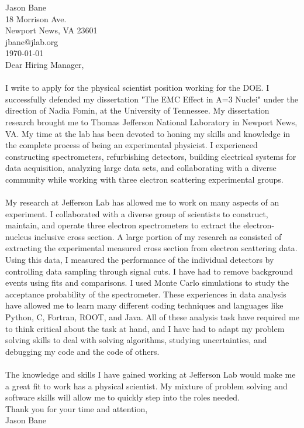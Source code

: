 \documentclass[12pt,letterpaper]{article}
\newcommand{\CPP}
{C\nolinebreak[4]\hspace{-.05em}\raisebox{.22ex}{\footnotesize\bf ++}}
\begin{document}
\vspace*{-1.2cm}
\noindent Jason Bane\\
18 Morrison Ave. \\
Newport News, VA 23601 \\
jbane@jlab.org \\
\today\\

Dear Hiring Manager,

\paragraph{}I write to apply for the physical scientist position working for the DOE. I successfully defended my dissertation "The EMC Effect in A=3 Nuclei" under the direction of Nadia Fomin, at the University of Tennessee. My dissertation research brought me to Thomas Jefferson National Laboratory in Newport News, VA. My time at the lab has been devoted to honing my skills and knowledge in the complete process of being an experimental physicist. I experienced constructing spectrometers, refurbishing detectors, building electrical systems for data acquisition, analyzing large data sets, and collaborating with a diverse community while working with three electron scattering experimental groups.
\paragraph{}My research at Jefferson Lab has allowed me to work on many aspects of an experiment. I collaborated with a diverse group of scientists to construct, maintain, and operate three electron spectrometers to extract the electron-nucleus inclusive cross section. A large portion of my research as consisted of extracting the experimental measured cross section from electron scattering data. Using this data, I measured the performance of the individual detectors by controlling data sampling through signal cuts. I have had to remove background events using fits and comparisons. I used Monte Carlo simulations to study the acceptance probability of the spectrometer. These experiences in data analysis have allowed me to learn many different coding techniques and languages like Python, \CPP, Fortran, ROOT, and Java. All of these analysis task have required me to think critical about the task at hand, and I have had to adapt my problem solving skills to deal with solving algorithms, studying uncertainties, and debugging my code and the code of others. 


\paragraph{}The knowledge and skills I have gained working at Jefferson Lab would make me a great fit to work has a physical scientist. My mixture of problem solving and software skills will allow me to quickly step into the roles needed.      
\\

\noindent Thank you for your time and attention,\\
\noindent Jason Bane
\end{document}
